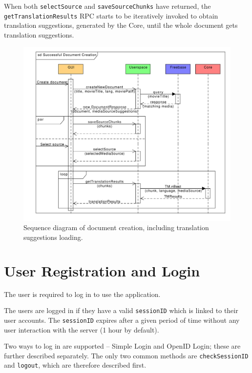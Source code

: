 {When both {\tt selectSource} and {\tt saveSourceChunks} have returned, the {\tt getTranslationResults} RPC starts to be iteratively invoked to obtain translation suggestions, generated by the Core, until the whole document gets translation suggestions.

\begin{figure}[h]
\begin{center}
\includegraphics[scale=0.65]{figures/document_creation_sequence_RPC.pdf}
\end{center}
\caption{Sequence diagram of document creation, including translation suggestions loading.}\label{rpc:sd:document_creation}
\end{figure}

\section{User Registration and Login}
\label{sec:rpc:login}

The user is required to log in to use the application.

The users are logged in if they have a valid {\tt sessionID} which is linked to their user accounts.
The {\tt sessionID} expires after a given period of time without any user interaction with the server (1 hour by default).

Two ways to log in are supported -- Simple Login and OpenID Login; these are further described separately. The only two common methods are {\tt checkSessionID} and {\tt logout}, which are therefore described first.

}
